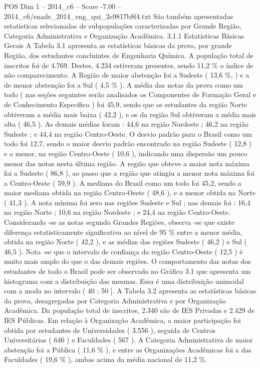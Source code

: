 \begin{textsample}{POS Dim 1 – 2014\_c6 – Score -7.00 – 2014\_c6/enade\_2014\_eng\_qui\_2e9817b8f4.txt}
São também apresentadas estatísticas selecionadas de subpopulações caracterizadas por Grande Região, Categoria Administrativa e Organização Acadêmica. 3.1.1 Estatísticas Básicas Gerais A Tabela 3.1 apresenta as estatísticas básicas da prova, por grande Região, dos estudantes concluintes de Engenharia Química.
A população total de inscritos foi de 4.769.
Destes, 4.234 estiveram presentes, sendo 11,2 \% o índice de não comparecimento.
A Região de maior abstenção foi a Sudeste ( 13,6 \%, ) e a de menor abstenção foi a Sul ( 4,5 \% ).
A média das notas da prova como um todo ( nas seções seguintes serão analisados os Componentes de Formação Geral e de Conhecimento Específico ) foi 45,9, sendo que os estudantes da região Norte obtiveram a média mais baixa ( 42,2 ), e os da região Sul obtiveram a média mais alta ( 46,5 ).
As demais médias foram : 44,6 na região Nordeste ; 46,2 na região Sudeste ; e 44,4 na região Centro-Oeste.
O desvio padrão para o Brasil como um todo foi 12,7, sendo o maior desvio padrão encontrado na região Sudeste ( 12,8 ) e o menor, na região Centro-Oeste ( 10,6 ), indicando uma dispersão um pouco menor das notas nesta última região.
A região que obteve a maior nota máxima foi a Sudeste ( 86,8 ), ao passo que a região que atingiu a menor nota máxima foi a Centro-Oeste ( 59,9 ).
A mediana do Brasil como um todo foi 45,2, sendo a maior mediana obtida na região Centro-Oeste ( 48,6 ), e a menor obtida na Norte ( 41,3 ).
A nota mínima foi zero nas regiões Sudeste e Sul ; nas demais foi : 16,4 na região Norte ; 10,6 na região Nordeste ; e 24,4 na região Centro-Oeste.
Considerando -se as notas segundo Grandes Regiões, observa -se que existe diferença estatisticamente significativa ao nível de 95 \% entre a menor média, obtida na região Norte ( 42,2 ), e as médias das regiões Sudeste ( 46,2 ) e Sul ( 46,5 ).
Nota -se que o intervalo de confiança da região Centro-Oeste ( 12,5 ) é muito mais amplo do que o das demais regiões.
O comportamento das notas dos estudantes de todo o Brasil pode ser observado no Gráfico 3.1 que apresenta um histograma com a distribuição das mesmas.
Essa é uma distribuição unimodal com a moda no intervalo ( 40 ; 50 ].
A Tabela 3.2 apresenta as estatísticas básicas da prova, desagregadas por Categoria Administrativa e por Organização Acadêmica.
Da população total de inscritos, 2.340 são de IES Privadas e 2.429 de IES Públicas.
Em relação à Organização Acadêmica, a maior participação foi obtida por estudantes de Universidades ( 3.556 ), seguida de Centros Universitários ( 646 ) e Faculdades ( 567 ).
A Categoria Administrativa de maior abstenção foi a Pública ( 11,6 \% ), e entre as Organizações Acadêmicas foi a das Faculdades ( 19,6 \% ), ambas acima da média nacional de 11,2 \%.

\end{textsample}
